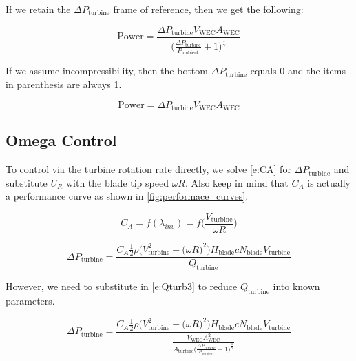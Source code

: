 \documentclass[conf]{new-aiaa}
\begin{document}
If we retain the $\Delta P_\text{turbine}$ frame of reference, then we get the following:

\begin{equation}
\label{e:P_sub6}
\text{Power} = \frac{\Delta P_\text{turbine} V_\text{WEC} A_\text{WEC}} {\bigg(\frac{\Delta P_\text{turbine} }{P_\text{ambient} } + 1\bigg)^\frac{1}{\gamma}}
\end{equation}

If we assume incompressibility, then the bottom $\Delta P_\text{turbine}$ equals 0 and the items in parenthesis are always 1.

\begin{equation}
\label{e:P_sub6_incompressible}
\text{Power} = \Delta P_\text{turbine} V_\text{WEC} A_\text{WEC}
\end{equation}

\subsection{Omega Control}

To control via the turbine rotation rate directly, we solve \cref{e:CA} for $\Delta P_\text{turbine}$ and substitute $U_R$ with the blade tip speed $\omega R$.  Also keep in mind that $C_A$ is actually a performance curve as shown in \cref{fig:performace_curves}.

    \begin{equation}
\label{e:CA2}
C_A = f(\lambda_{inv}) = f\bigg(\frac{V_\text{turbine}}{\omega R}\bigg)
\end{equation}

    \begin{equation}
\label{e:deltaP}
\Delta P_\text{turbine} = \frac{C_A \frac{1}{2}\rho \Bigg(V_\text{turbine}^2 + \bigg(\omega R \bigg)^2 \Bigg) H_\text{blade} c N_\text{blade} V_\text{turbine}} { Q_\text{turbine}}
\end{equation}

However, we need to substitute in \cref{e:Qturb3} to reduce $Q_\text{turbine}$ into known parameters.

    \begin{equation}
\label{e:deltaP2}
\Delta P_\text{turbine} = \frac{C_A \frac{1}{2}\rho \Bigg(V_\text{turbine}^2 + \bigg(\omega R \bigg)^2 \Bigg) H_\text{blade} c N_\text{blade} V_\text{turbine}} { \frac{V_\text{WEC} A_\text{WEC}^2} {A_\text{turbine} \bigg(\frac{\Delta P_\text{turbine} }{P_\text{ambient} } + 1\bigg)^\frac{1}{\gamma}}}
\end{equation}
\end{document}
